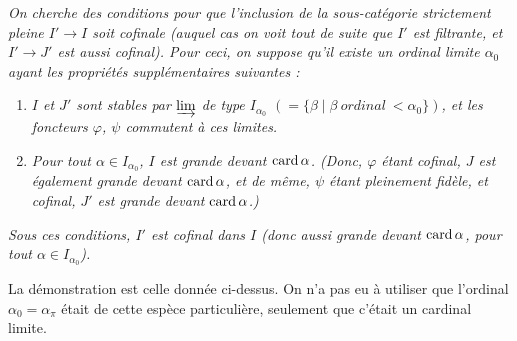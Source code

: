 \textit{On cherche des conditions pour que l'inclusion de la sous-catégorie strictement pleine $I' \longrightarrow I$ soit cofinale (auquel cas on voit tout de suite que $I'$ est filtrante, et $I' \longrightarrow J'$ est aussi cofinal). Pour ceci, on suppose qu'il existe un \textup{ordinal limite} $\alpha_0$ ayant les propriétés supplémentaires suivantes :}

\begin{enumerate}[label={}]
\item[\textit{2)}] \textit{$I$ et $J'$ sont stables par $\varinjlim$ de type $I_{\alpha_0}$ $(= \{\beta \mid \beta \ \textit{ordinal}\ < \alpha_0\})$, et les foncteurs $\varphi$, $\psi$ commutent à ces limites.}
\item[\textit{3)}] \textit{Pour tout $\alpha \in I_{\alpha_0}$, $I$ est grande devant $\operatorname{card}\alpha$. (Donc, $\varphi$ étant cofinal, $J$ est également grande devant $\operatorname{card}\alpha$, et de même, $\psi$ étant pleinement fidèle, et cofinal, $J'$ est grande devant $\operatorname{card}\alpha$.)}
\end{enumerate}

\textit{Sous ces conditions, $I'$ est cofinal dans $I$ (donc aussi grande devant $\operatorname{card}\alpha$, pour tout $\alpha \in I_{\alpha_0}$).}

La démonstration est celle donnée ci-dessus. On n'a pas eu à utiliser que l'ordinal $\alpha_0 = \alpha_\pi$ était de cette espèce particulière, seulement que c'était un cardinal limite.



